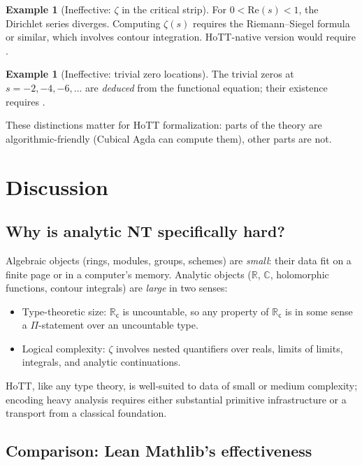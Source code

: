 \documentclass[12pt]{article}
\theoremstyle{definition}
\newtheorem{example}[theorem]{Example}
\theoremstyle{remark}
\newcommand{\C}{\mathbb{C}}
\newcommand{\R}{\mathbb{R}}
\newcommand{\Rc}{\R_{\mathsf{c}}}
\begin{document}
\begin{example}[Ineffective: $\zeta$ in the critical strip]
For $0 < \mathrm{Re}(s) < 1$, the Dirichlet series diverges. Computing
$\zeta(s)$ requires the Riemann--Siegel formula or similar, which involves
contour integration. HoTT-native version would require .
\end{example}

\begin{example}[Ineffective: trivial zero locations]
The trivial zeros at $s = -2, -4, -6, \ldots$ are \emph{deduced} from the
functional equation; their existence requires .
\end{example}

These distinctions matter for HoTT formalization: parts of the theory are
algorithmic-friendly (Cubical Agda can compute them), other parts are not.

\section{Discussion}\label{sec:discussion}

\subsection{Why is analytic NT specifically hard?}

Algebraic objects (rings, modules, groups, schemes) are \emph{small}: their
data fit on a finite page or in a computer's memory. Analytic objects
($\R$, $\C$, holomorphic functions, contour integrals) are \emph{large} in
two senses:
\begin{itemize}
\item Type-theoretic size: $\Rc$ is uncountable, so any property of $\Rc$
is in some sense a $\Pi$-statement over an uncountable type.
\item Logical complexity: $\zeta$ involves nested quantifiers over reals,
limits of limits, integrals, and analytic continuations.
\end{itemize}
HoTT, like any type theory, is well-suited to data of small or medium
complexity; encoding heavy analysis requires either substantial primitive
infrastructure or a transport from a classical foundation.

\subsection{Comparison: Lean Mathlib's effectiveness}
\end{document}
